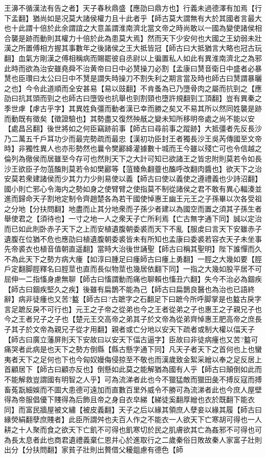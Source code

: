 王濞不循漢法有告之者】天子春秋鼎盛【應劭曰鼎方也】行義未過德澤有加焉【行下孟翻】猶尚如是况莫大諸侯權力且十此者乎【師古莫大謂無有大於其國者言最大也十此謂十倍於此余謂誼之大意盖謂淮南濟北當文帝之時尚敢以一國為變使諸侯相合襲是跡而動則其權力十倍於此為患莫大焉】然而天下少安何也大國之王幼弱未壯漢之所置傅相方握其事數年之後諸侯之王大抵皆冠【師古曰大抵猶言大略也冠古玩翻】血氣方剛漢之傅相稱病而賜罷彼自丞尉以上徧置私人如此有異淮南濟北之為邪此時而欲為治安雖堯舜不治黄帝曰日中必熭操刀必割【孟康曰熭音衛日中盛者必暴熭也臣瓚曰太公曰日中不熭是謂失時操刀不割失利之期言當及時也師古曰熭謂暴曬之也】今令此道順而全安甚易【易以豉翻】不肯蚤為已乃墮骨肉之屬而抗剄之【應劭曰抗其頭而剄之也師古曰墮毁也抗舉也剄割頸也墮許規翻剄工頂翻】豈有異秦之季世虖【虖古乎字】其異姓負彊而動者漢已幸而勝之矣又不易其所以然同姓襲是跡而動既有徵矣【徵證驗也】其勢盡又復然殃旤之變未知所移明帝處之尚不能以安【處昌呂翻】後世將如之何臣竊跡前事【師古曰尋前事之蹤跡】大抵彊者先反長沙乃二萬五千戶耳功少而最完勢疏而最忠【漢初功臣封王者獨長沙王吳芮傳國至文帝時】非獨性異人也亦形勢然也曩令樊酈絳灌據數十城而王今雖以殘亡可也令信越之倫列為徹侯而居雖至今存可也然則天下之大計可知已欲諸王之皆忠附則莫若令如長沙王欲臣子勿菹醢則莫若令如樊酈等【菹臻魚翻虀也醢呼改翻肉醬也】欲天下之治安莫若衆建諸侯而少其力力少則易使以義【師古曰使以義使之遵禮義也少詩沼翻】國小則亡邪心令海内之勢如身之使臂臂之使指莫不制從諸侯之君不敢有異心輻湊並進而歸命天子割地定制令齊趙楚各為若干國使悼惠王幽王元王之子孫畢以次各受祖之分地【分扶問翻】地盡而止其分地衆而子孫少者建以為國空而置之須其子孫生者舉使君之【須待也】一寸之地一人之衆天子亡所利焉【亡古無字通下同】誠以定治而已如此則卧赤子天下之上而安植遺腹朝委裘而天下不亂【服䖍曰言天下安雖赤子遺腹在位猶不危也應劭曰植遺腹朝委裘皆未有所知也孟康曰委裘若容衣天子未坐事先帝裘衣也植音值朝直遥翻】當時大治後世誦聖【師古曰稱其聖明】陛下誰憚而久不為此天下之勢方病大瘇【如淳曰腫足曰瘇師古曰瘇上勇翻】一脛之大幾如要【脛戶定翻脚脛釋名曰脛莖也直而長似物莖也幾居依翻下同】一指之大幾如股平居不可屈伸一二指慉身慮無聊【師古曰慉謂動而痛也聊賴也慉丑六翻】失今不治必為錮疾【師古曰錮疾堅久之疾】後雖有扁鵲不能為己【師古曰扁鵲良醫也為治也已語終辭】病非徒瘇也又苦?盭【師古曰?古蹠字之石翻足下曰蹠今所呼脚掌是也盭古戾字言足蹠反戾不可行也】元王之子帝之從弟也今之王者從弟之子也惠王之子親兄子也今之王者兄子之子也【楚元王交高帝之弟其子於文帝為從弟齊悼惠王肥高帝之庶長子其子於文帝為親兄子從才用翻】親者或亡分地以安天下疏者或制大權以偪天子【師古曰廣立藩屏則天下安故曰以安天下偪古逼字】臣故曰非徒病瘇也又苦?盭可痛哭者此病是也天下之勢方倒縣【縣古懸字通下同】凡天子者天下之首何也上也蠻夷者天下之足何也下也今匈奴嫚侮侵掠至不敬也而漢歲致金絮采繒以奉之足反居上首顧居下【師古曰顧亦反也】倒懸如此莫之能解猶為國有人乎【師古曰顛倒如此而不能解救豈謂國有明智之人乎】可為流涕者此也今不獵猛敵而獵田彘不搏反寇而搏畜菟翫細娛而不圖大患德可遠加而直數百里外威令不勝可為流涕者此也今庶人屋壁得為帝服倡優下賤得為后飾且帝之身自衣皁綈【綈徒奚翻厚繒也衣於既翻下能衣同】而富民牆屋被文繡【被皮義翻】天子之后以緣其領庶人孽妾以緣其履【師古曰緣熒絹翻孽庶賤者】此臣所謂舛也夫百人作之不能衣一人欲天下亡寒胡可得也一人耕之十人聚而食之欲天下亡飢不可得也飢寒切於民之肌膚欲其亡為姦邪不可得也可為長太息者此也商君遺禮義棄仁恩并心於進取行之二歲秦俗日敗故秦人家富子壯則出分【分扶問翻】家貧子壯則出贅借父耰鉏慮有德色【師